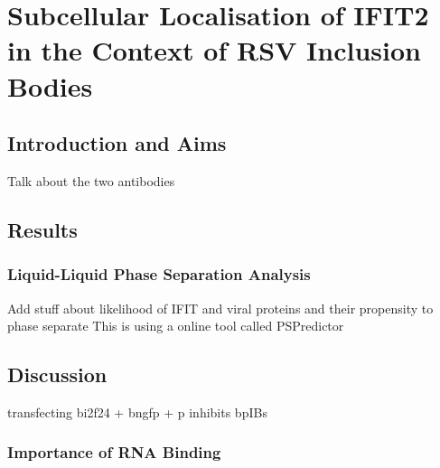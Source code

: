 \chapter{Subcellular Localisation of IFIT2 in the Context of RSV Inclusion Bodies} \label{ch:Subcellular Localisation of IFIT2 in the Context of RSV Inclusion Bodies}
\section{Introduction and Aims} \label{sec:Introduction and Aims-Chapter5}
Talk about the two antibodies

\section{Results} \label{sec:Results-Chapter5}






\subsection{Liquid-Liquid Phase Separation Analysis} \label{subsec:Liquid-Liquid Phase Separation Analysis}
Add stuff about likelihood of IFIT and viral proteins and their propensity to phase separate \newline
This is using a online tool called PSPredictor


\section{Discussion} \label{sec:Discussion-Chapter5}
transfecting bi2f24 + bngfp + p inhibits bpIBs

\subsection{Importance of RNA Binding} \label{subsec:Importance of RNA Binding}
